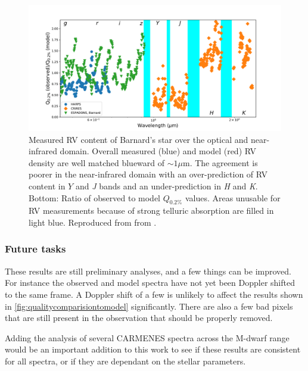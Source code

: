 \begin{figure}
    \centering
    \includegraphics[width=0.7\linewidth]{figures/information-content/artigau2018_figures/all_w2}
    \caption[Measured RV content of Barnard's star over the optical and near-infrared domain.]{Measured RV content of Barnard's star over the optical and near-infrared domain. Overall measured (blue) and model (red) RV density are well matched blueward of $\sim1\mu$m. The agreement is poorer in the near-infrared domain with an over-prediction of RV content in $Y$ and \emph{J} bands and an under-prediction in \emph{H} and \emph{K}.
        Bottom: Ratio of observed to model $Q_{0.2\%}$ values. Areas unusable for RV measurements because of strong telluric absorption are filled in light blue. Reproduced from from \citep{artigau_optical_2018}.}
    \label{fig:allw2}
\end{figure}




\subsubsection{Future tasks}
\label{subsubsec:future_tasksaims}
These results are still preliminary analyses, and a few things can be improved.
For instance the observed and model spectra have not yet been Doppler shifted to the same frame.
A Doppler shift of a few \nm{} is unlikely to affect the results shown in \cref{fig:qualitycomparisiontomodel} significantly.
There are also a few bad pixels that are still present in the observation that should be properly removed.

Adding the analysis of several CARMENES spectra across the M-dwarf range would be an important addition to this work to see if these results are consistent for all spectra, or if they are dependant on the stellar parameters.
